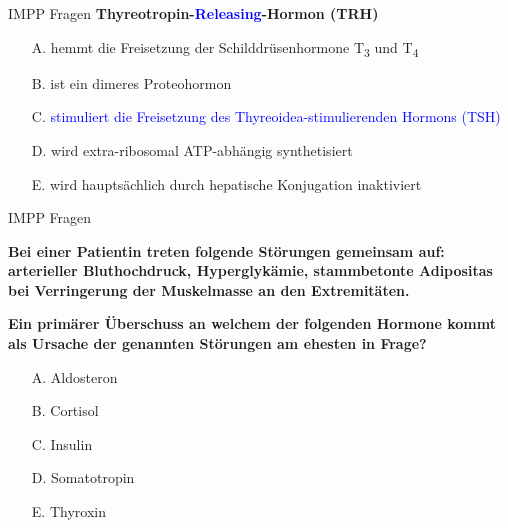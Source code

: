 \documentclass{beamer}
\begin{document}
\begin{frame}{IMPP Fragen}
\textbf{
Thyreotropin-\textcolor{blue}{Releasing}-Hormon (TRH)} \\[0.2 cm]

\begin{itemize}
\item[A.] hemmt die Freisetzung der Schilddrüsenhormone T\textsubscript{3} und T\textsubscript{4}
\item[B.] ist ein dimeres Proteohormon
\item[C.] \textcolor{blue}{stimuliert die Freisetzung des Thyreoidea-stimulierenden Hormons (TSH)} %
\item[D.] wird extra-ribosomal ATP-abhängig synthetisiert
\item[E.] wird hauptsächlich durch hepatische Konjugation inaktiviert 

\end{itemize}
    
\end{frame}






\begin{frame}{IMPP Fragen}

\textbf{Bei einer Patientin treten folgende Störungen gemeinsam auf: arterieller Bluthochdruck, Hyperglykämie, stammbetonte Adipositas bei Verringerung der Muskelmasse an den Extremitäten.}

\textbf{Ein primärer Überschuss an welchem der folgenden Hormone kommt als Ursache der genannten Störungen am ehesten in Frage?} \\[0.2 cm]

\begin{itemize}
\item[A.] Aldosteron
\item[B.] Cortisol %
\item[C.] Insulin
\item[D.] Somatotropin
\item[E.] Thyroxin

\end{itemize}
    
\end{frame}
\end{document}
